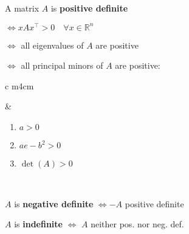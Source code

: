 \documentclass[a4paper, 10pt]{article}
\theoremstyle{definition}
\newcommand{\R}{\mathbb{R}}
\begin{document}
\begin{note*}
    A matrix \(A\) is \textbf{positive definite}
    
    \(\iff xAx^\top > 0 \quad \forall x \in \R^n\)

    \(\iff\) all eigenvalues of \(A\) are positive

    \(\iff\) all principal minors of \(A\) are positive:

    \begin{tabular}{c m{4cm}}
        & \begin{enumerate}
            \vspace{15pt}
            \item \(a > 0\)
            \item \(ae - b^2 > 0\)
            \item \(\det(A) > 0\)
        \end{enumerate} \\
    \end{tabular}

    \(A\) is \textbf{negative definite} \(\iff -A\) positive definite

    \(A\) is \textbf{indefinite} \(\iff\) \(A\) neither pos. nor neg. def.
\end{note*}
\end{document}
